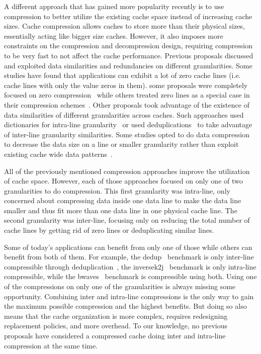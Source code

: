 A different approach that has gained more popularity recently is to use compression to better utilize the existing cache space instead of increasing cache sizes. Cache compression allows caches to store more than their physical sizes, essentially acting like bigger size caches. However, it also imposes more constraints on the compression and decompression design, requiring compression to be very fast to not affect the cache performance. Previous proposals discussed and exploited data similarities and redundancies on different granularities. Some studies have found that applications can exhibit a lot of zero cache lines (i.e. cache lines with only the value zeros in them). some proposals were completely focused on zero compression~\cite{zca} while others treated zero lines as a special case in their compression schemes~\cite{fpc, hycomp, dedup}. Other proposals took advantage of the existence of data similarities of different granularities across caches. Such approaches used dictionaries for intra-line granularity~\cite{cpack, dish} or used deduplications~\cite{dedup} to take advantage of inter-line granularity similarities. Some studies opted to do data compression to decrease the data size on a line or smaller granularity rather than exploit existing cache wide data patterns~\cite{bdi, sc2, hycomp}.\par
All of the previously mentioned compression approaches improve the utilization of cache space. However, each of those approaches focused on only one of two granularities to do compression. This first granularity was intra-line, only concerned about compressing data inside one data line to make the data line smaller and thus fit more than one data line in one physical cache line. The second granularity was inter-line, focusing only on reducing the total number of cache lines by getting rid of zero lines or deduplicating similar lines.\par
Some of today's applications can benefit from only one of those while others can benefit from both of them. For example, the dedup~\cite{parsec} benchmark is only inter-line compressible through deduplication~\cite{dedup}, the inversek2j~\cite{axbench} benchmark is only intra-line compressible, while the bwaves~\cite{spec} benchmark is compressible using both. Using one of the compressions on only one of the granularities is always missing some opportunity. Combining inter and intra-line compressions is the only way to gain the maximum possible compression and the highest benefits. But doing so also means that the cache organization is more complex, requires redesigning replacement policies, and more overhead. To our knowledge, no previous proposals have considered a compressed cache doing inter and intra-line compression at the same time.\par

